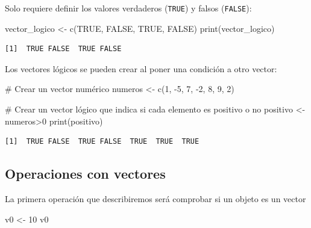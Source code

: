 \documentclass[
  letterpaper,
]{scrbook}
\newenvironment{Shaded}{\begin{snugshade}}{\end{snugshade}}
\newcommand{\CommentTok}[1]{\textcolor[rgb]{0.37,0.37,0.37}{#1}}
\newcommand{\ConstantTok}[1]{\textcolor[rgb]{0.56,0.35,0.01}{#1}}
\newcommand{\DecValTok}[1]{\textcolor[rgb]{0.68,0.00,0.00}{#1}}
\newcommand{\FunctionTok}[1]{\textcolor[rgb]{0.28,0.35,0.67}{#1}}
\newcommand{\NormalTok}[1]{\textcolor[rgb]{0.00,0.23,0.31}{#1}}
\newcommand{\OtherTok}[1]{\textcolor[rgb]{0.00,0.23,0.31}{#1}}
\newcommand{\SpecialCharTok}[1]{\textcolor[rgb]{0.37,0.37,0.37}{#1}}
\begin{document}
Solo requiere definir los valores verdaderos (\texttt{TRUE}) y falsos
(\texttt{FALSE}):

\begin{Shaded}
\begin{Highlighting}[]
\NormalTok{vector\_logico }\OtherTok{\textless{}{-}} \FunctionTok{c}\NormalTok{(}\ConstantTok{TRUE}\NormalTok{, }\ConstantTok{FALSE}\NormalTok{, }\ConstantTok{TRUE}\NormalTok{, }\ConstantTok{FALSE}\NormalTok{)}
\FunctionTok{print}\NormalTok{(vector\_logico)}
\end{Highlighting}
\end{Shaded}

\begin{verbatim}
[1]  TRUE FALSE  TRUE FALSE
\end{verbatim}

Los vectores lógicos se pueden crear al poner una condición a otro
vector:

\begin{Shaded}
\begin{Highlighting}[]
\CommentTok{\# Crear un vector numérico}
\NormalTok{numeros }\OtherTok{\textless{}{-}} \FunctionTok{c}\NormalTok{(}\DecValTok{1}\NormalTok{, }\SpecialCharTok{{-}}\DecValTok{5}\NormalTok{, }\DecValTok{7}\NormalTok{, }\SpecialCharTok{{-}}\DecValTok{2}\NormalTok{, }\DecValTok{8}\NormalTok{, }\DecValTok{9}\NormalTok{, }\DecValTok{2}\NormalTok{)}

\CommentTok{\# Crear un vector lógico que indica si cada elemento es positivo o no}
\NormalTok{positivo }\OtherTok{\textless{}{-}}\NormalTok{ numeros}\SpecialCharTok{\textgreater{}}\DecValTok{0}
\FunctionTok{print}\NormalTok{(positivo)}
\end{Highlighting}
\end{Shaded}

\begin{verbatim}
[1]  TRUE FALSE  TRUE FALSE  TRUE  TRUE  TRUE
\end{verbatim}

\hypertarget{operaciones-con-vectores}{%
\subsection{Operaciones con vectores}\label{operaciones-con-vectores}}

La primera operación que describiremos será comprobar si un objeto es un
vector

\begin{Shaded}
\begin{Highlighting}[]
\NormalTok{v0 }\OtherTok{\textless{}{-}} \DecValTok{10}
\NormalTok{v0}
\end{Highlighting}
\end{Shaded}
\end{document}
